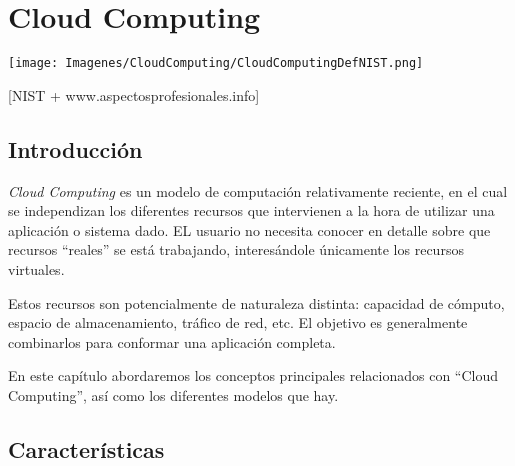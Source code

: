 %
%
\chapter{Cloud Computing}




\texttt{[image: Imagenes/CloudComputing/CloudComputingDefNIST.png]}

 [NIST + www.aspectosprofesionales.info]


\section{Introducci\'on}

\textit{Cloud Computing} es un modelo de computaci\'on relativamente reciente, en el cual se independizan los diferentes recursos que intervienen a la hora de utilizar una aplicaci\'on o sistema dado. EL usuario no necesita conocer en detalle sobre que recursos ``reales'' se est\'a trabajando, interes\'andole \'unicamente los recursos virtuales.

Estos recursos son potencialmente de naturaleza distinta: capacidad de c\'omputo, espacio de almacenamiento, tr\'afico de red, etc. El objetivo es generalmente combinarlos para conformar una aplicaci\'on completa.

En este cap\'itulo abordaremos los conceptos principales relacionados con ``Cloud Computing'', as\'i como los diferentes modelos que hay.
 

\section{Caracter\'isticas}

